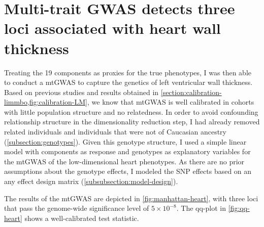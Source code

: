 \section{Multi-trait GWAS detects three loci associated with heart wall thickness}
\label{section:GWAS-3Dheart}
Treating the \num{19} components as proxies for the true phenotypes, I was then able to conduct a mtGWAS to capture the genetics of left ventricular wall thickness. Based on previous studies \citep{Price2006,Patterson2006} and results obtained in \cref{section:calibration-limmbo,fig:calibration-LM}, we know that mtGWAS is well calibrated in cohorts with little population structure and no relatedness. In order to avoid confounding relationship structure in the dimensionality reduction step, I had already removed related individuals and individuals that were not of Caucasian ancestry (\cref{subsection:genotypes}). Given this genotype structure, I used a simple linear model with components as response and genotypes as explanatory variables for the mtGWAS of the low-dimensional heart phenotypes. As there are no prior assumptions about the genotype effects, I modeled the SNP effects based on an any effect design matrix (\cref{subsubsection:model-design}). 

The results of the mtGWAS are depicted in \cref{fig:manhattan-heart}, with three loci that pass the genome-wide significance level of \(5 \times 10^{-8}\). The qq-plot in \cref{fig:qq-heart} shows a well-calibrated test statistic.

